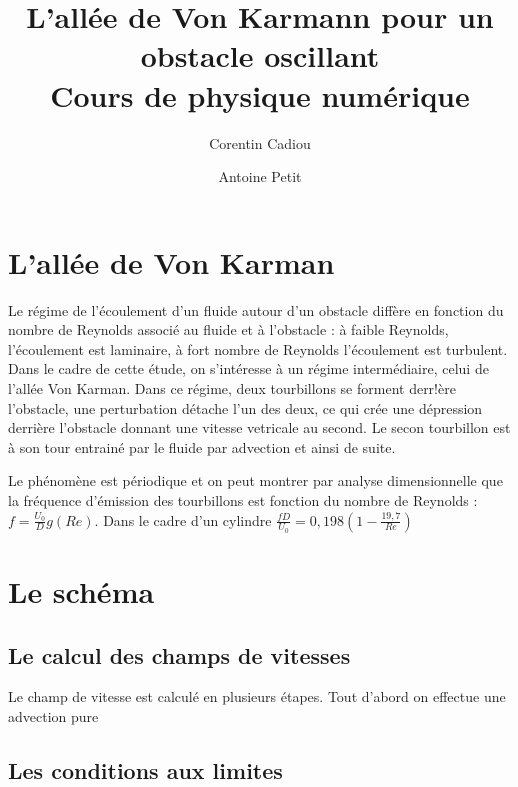 
\title{L'allée de Von Karmann pour un obstacle oscillant\\
Cours de physique numérique}

\author{Corentin Cadiou \and Antoine Petit}
\date{}



\maketitle

\tableofcontents

\section{L'allée de Von Karman}
	
	Le régime de l'écoulement d'un fluide autour d'un obstacle diffère en fonction du nombre de Reynolds associé au fluide et à l'obstacle : à faible Reynolds, l'écoulement est laminaire, à fort nombre de Reynolds l'écoulement est turbulent. Dans le cadre de cette étude, on s'intéresse à un régime intermédiaire, celui de l'allée Von Karman. Dans ce régime, deux tourbillons se forment derr!ère l'obstacle, une perturbation détache l'un des deux, ce qui crée une dépression derrière l'obstacle donnant une vitesse vetricale au second. Le secon tourbillon est à son tour entrainé par le fluide par advection et ainsi de suite.
	
	
	Le phénomène est périodique et on peut montrer par analyse dimensionnelle que la fréquence d'émission des tourbillons est fonction du nombre de Reynolds : $f = \frac{U_0}{D}g(Re)$. Dans le cadre d'un cylindre $\frac{fD}{U_0}=0,198\left (1-\frac{19,7}{Re}\right )$ \cite{Von_Karman}
	
	
	
	

\section{Le schéma}

	\subsection{Le calcul des champs de vitesses}
		
		Le champ de vitesse est calculé en plusieurs étapes. Tout d'abord on effectue une advection pure 
		
	\subsection{Les conditions aux limites}
		
